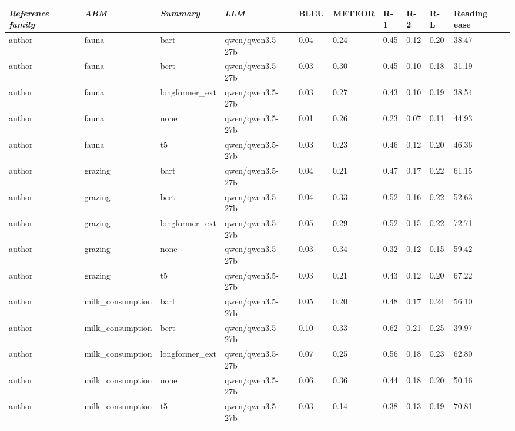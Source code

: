 \begin{tabular}{|l|l|l|l|l|l|l|l|l|l|}
\hline
\textit{\textbf{Reference family}} & \textit{\textbf{ABM}} & \textit{\textbf{Summary}} & \textit{\textbf{LLM}} & BLEU & METEOR & R-1 & R-2 & R-L & Reading ease \\
 \hline
 author & fauna & bart & qwen/qwen3.5-27b & 0.04 & 0.24 & 0.45 & 0.12 & 0.20 & 38.47 \\
 \hline
 author & fauna & bert & qwen/qwen3.5-27b & 0.03 & 0.30 & 0.45 & 0.10 & 0.18 & 31.19 \\
 \hline
 author & fauna & longformer\_ext & qwen/qwen3.5-27b & 0.03 & 0.27 & 0.43 & 0.10 & 0.19 & 38.54 \\
 \hline
 author & fauna & none & qwen/qwen3.5-27b & 0.01 & 0.26 & 0.23 & 0.07 & 0.11 & 44.93 \\
 \hline
 author & fauna & t5 & qwen/qwen3.5-27b & 0.03 & 0.23 & 0.46 & 0.12 & 0.20 & 46.36 \\
 \hline
 author & grazing & bart & qwen/qwen3.5-27b & 0.04 & 0.21 & 0.47 & 0.17 & 0.22 & 61.15 \\
 \hline
 author & grazing & bert & qwen/qwen3.5-27b & 0.04 & 0.33 & 0.52 & 0.16 & 0.22 & 52.63 \\
 \hline
 author & grazing & longformer\_ext & qwen/qwen3.5-27b & 0.05 & 0.29 & 0.52 & 0.15 & 0.22 & 72.71 \\
 \hline
 author & grazing & none & qwen/qwen3.5-27b & 0.03 & 0.34 & 0.32 & 0.12 & 0.15 & 59.42 \\
 \hline
 author & grazing & t5 & qwen/qwen3.5-27b & 0.03 & 0.21 & 0.43 & 0.12 & 0.20 & 67.22 \\
 \hline
 author & milk\_consumption & bart & qwen/qwen3.5-27b & 0.05 & 0.20 & 0.48 & 0.17 & 0.24 & 56.10 \\
 \hline
 author & milk\_consumption & bert & qwen/qwen3.5-27b & 0.10 & 0.33 & 0.62 & 0.21 & 0.25 & 39.97 \\
 \hline
 author & milk\_consumption & longformer\_ext & qwen/qwen3.5-27b & 0.07 & 0.25 & 0.56 & 0.18 & 0.23 & 62.80 \\
 \hline
 author & milk\_consumption & none & qwen/qwen3.5-27b & 0.06 & 0.36 & 0.44 & 0.18 & 0.20 & 50.16 \\
 \hline
 author & milk\_consumption & t5 & qwen/qwen3.5-27b & 0.03 & 0.14 & 0.38 & 0.13 & 0.19 & 70.81 \\
\hline
\end{tabular}
